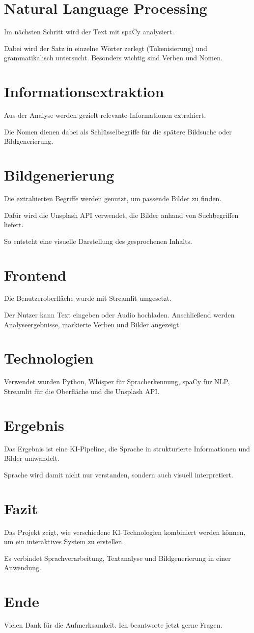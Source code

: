 \documentclass[a4paper,12pt]{article}
\begin{document}
\section*{Natural Language Processing}
Im nächsten Schritt wird der Text mit spaCy analysiert.

Dabei wird der Satz in einzelne Wörter zerlegt (Tokenisierung) und grammatikalisch untersucht. Besonders wichtig sind Verben und Nomen.

\section*{Informationsextraktion}
Aus der Analyse werden gezielt relevante Informationen extrahiert.

Die Nomen dienen dabei als Schlüsselbegriffe für die spätere Bildsuche oder Bildgenerierung.

\section*{Bildgenerierung}
Die extrahierten Begriffe werden genutzt, um passende Bilder zu finden.

Dafür wird die Unsplash API verwendet, die Bilder anhand von Suchbegriffen liefert.

So entsteht eine visuelle Darstellung des gesprochenen Inhalts.

\section*{Frontend}
Die Benutzeroberfläche wurde mit Streamlit umgesetzt.

Der Nutzer kann Text eingeben oder Audio hochladen. Anschließend werden Analyseergebnisse, markierte Verben und Bilder angezeigt.

\section*{Technologien}
Verwendet wurden Python, Whisper für Spracherkennung, spaCy für NLP, Streamlit für die Oberfläche und die Unsplash API.

\section*{Ergebnis}
Das Ergebnis ist eine KI-Pipeline, die Sprache in strukturierte Informationen und Bilder umwandelt.

Sprache wird damit nicht nur verstanden, sondern auch visuell interpretiert.

\section*{Fazit}
Das Projekt zeigt, wie verschiedene KI-Technologien kombiniert werden können, um ein interaktives System zu erstellen.

Es verbindet Sprachverarbeitung, Textanalyse und Bildgenerierung in einer Anwendung.

\section*{Ende}
Vielen Dank für die Aufmerksamkeit. Ich beantworte jetzt gerne Fragen.
\end{document}
